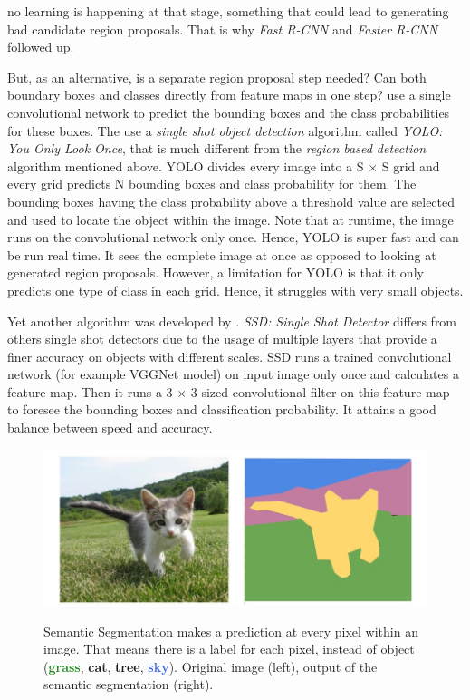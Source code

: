 \documentclass[12pt,a4paper,table,dvipsnames,tikz]{report}
\newcommand{\term}{\textit}
\newcommand{\acronym}{\MakeUppercase}
\newcommand{\boldcolor}[2]{\textbf{\textcolor{#1}{#2}}}
\begin{document}
	no learning is happening at that stage, something that could lead to generating bad 
	candidate region proposals. That is why \term{Fast \acronym{r-cnn}} and 
	\term{Faster \acronym{r-cnn}} followed up.
	\par
	But, as an alternative, is a separate region proposal step needed? Can both boundary 
	boxes and classes directly from feature maps in one step? \citet{Redmon} use a single 
	convolutional network to predict the bounding boxes and the class probabilities for 
	these boxes. The use a \term{single shot object detection} algorithm called 
	\term{\acronym{yolo}: You Only Look Once}, that is much different from the 
	\term{region based detection} algorithm mentioned above. \acronym{yolo} divides every 
	image into a S $\times$ S grid and every grid predicts N bounding boxes and class 
	probability for them. The bounding boxes having the class probability above a threshold 
	value are selected and used to locate the object within the image. Note that at runtime, 
	the image runs on the convolutional network only once. Hence, \acronym{yolo} is super 
	fast and can be run real time. It sees the complete image at once as opposed to looking 
	at generated region proposals. However, a limitation for \acronym{yolo} is that it only 
	predicts one type of class in each grid. Hence, it struggles with very small objects.
	\par
	Yet another algorithm was developed by \citet{Liu}. \term{\acronym{ssd}: Single Shot 
	Detector} differs from others single shot detectors due to the usage of multiple layers 
	that provide a finer accuracy on objects with different scales. \acronym{ssd} runs a 
	trained convolutional network (for example VGGNet model) on input image only once and 
	calculates a feature map. Then it runs a 3 $\times$ 3 sized convolutional filter on 
	this feature map to foresee the bounding boxes and classification probability. It 
	attains a good balance between speed and accuracy.
	\\
	
	\begin{figure}[h!]
		\caption{Semantic Segmentation makes a prediction at every pixel within an image. 
		That means there is a label for each pixel, instead of object (\boldcolor{ForestGreen}{grass}, \boldcolor{YellowOrange}{cat}, \boldcolor{VioletRed}{tree}, \boldcolor{RoyalBlue}{sky}). 
		Original image (left), output of the semantic segmentation (right).}
		\centering
		\includegraphics[width=\textwidth]{segm}
		\label{fig:segm}
	\end{figure}
	
\end{document}
